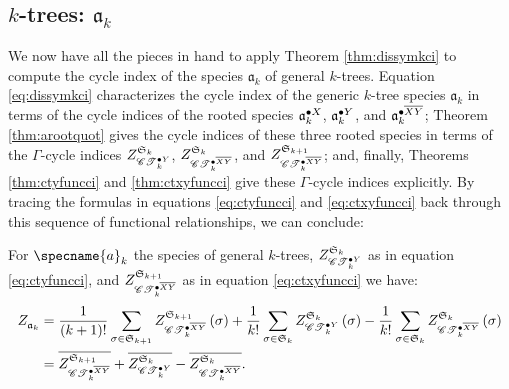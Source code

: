 \documentclass[sectionflow,singlespace,twoside,boldmathhdr,draft]{brandiss} %
\numberwithin{section}{chapter}
\numberwithin{figure}{chapter}
\begin{document}
\subsection{$k$-trees: $\mathfrak{a}_{k}$}\label{ss:ktcycind}
We now have all the pieces in hand to apply Theorem \ref{thm:dissymkci} to compute the cycle index of the species $\mathfrak{a}_{k}$ of general $k$-trees.
Equation \eqref{eq:dissymkci} characterizes the cycle index of the generic $k$-tree species $\mathfrak{a}_{k}$ in terms of the cycle indices of the rooted species $\pointed[X]{\mathfrak{a}}_{k}$, $\pointed[Y]{\mathfrak{a}}_{k}$, and $\pointed[\overline{XY}]{\mathfrak{a}}_{k}$; Theorem \ref{thm:arootquot} gives the cycle indices of these three rooted species in terms of the $\Gamma$-cycle indices $\gci{\symgp{k}}{\pointed[Y]{\specname{CT}}_{k}}$, $\gci{\symgp{k}}{\pointed[\overline{XY}]{\specname{CT}}_{k}}$, and $\gci{\symgp{k+1}}{\pointed[\overline{XY}]{\specname{CT}}_{k}}$; and, finally, Theorems \ref{thm:ctyfuncci} and \ref{thm:ctxyfuncci} give these $\Gamma$-cycle indices explicitly.
By tracing the formulas in equations \ref{eq:ctyfuncci} and \ref{eq:ctxyfuncci} back through this sequence of functional relationships, we can conclude:
\begin{theorem}
  \label{thm:akci}
  For $\specname{a}_{k}$ the species of general $k$-trees, $\gci{\symgp{k}}{\pointed[Y]{\specname{CT}}_{k}}$ as in equation \eqref{eq:ctyfuncci}, and $\gci{\symgp{k+1}}{\pointed[\overline{XY}]{\specname{CT}}_{k}}$ as in equation \eqref{eq:ctxyfuncci} we have:
  \label{thm:ktreecyc}
  \begin{subequations}
    \label{eq:akci}
    \begin{align}
      \ci{\mathfrak{a}_{k}} &= \frac{1}{\pbrac{k+1}!} \sum_{\sigma \in \symgp{k+1}} \gci{\symgp{k+1}}{\pointed[\overline{XY}]{\specname{CT}}_{k}} \pbrac{\sigma} + \frac{1}{k!} \sum_{\sigma \in \symgp{k}} \gci{\symgp{k}}{\pointed[Y]{\specname{CT}}_{k}} \pbrac{\sigma} - \frac{1}{k!} \sum_{\sigma \in \symgp{k}} \gci{\symgp{k}}{\pointed[\overline{XY}]{\specname{CT}}_{k}} \pbrac{\sigma} \label{eq:akciexplicit} \\
      &= \qgci{\symgp{k+1}}{\pointed[\overline{XY}]{\specname{CT}}_{k}} + \qgci{\symgp{k}}{\pointed[Y]{\specname{CT}}_{k}} - \qgci{\symgp{k}}{\pointed[\overline{XY}]{\specname{CT}}_{k}}. \label{eq:akciquot}
    \end{align}
  \end{subequations}

\end{theorem}
\end{document}
